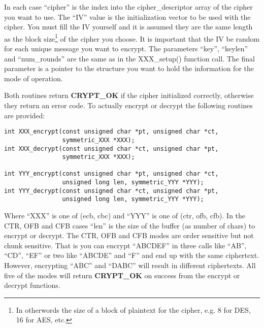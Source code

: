 \documentclass[b5paper]{book}
\begin{document}
In each case ``cipher'' is the index into the cipher\_descriptor array of the cipher you want to use.  The ``IV'' value is 
the initialization vector to be used with the cipher.  You must fill the IV yourself and it is assumed they are the same 
length as the block size\footnote{In otherwords the size of a block of plaintext for the cipher, e.g. 8 for DES, 16 for AES, etc.} 
of the cipher you choose.  It is important that the IV  be random for each unique message you want to encrypt.  The 
parameters ``key'', ``keylen'' and ``num\_rounds'' are the same as in the XXX\_setup() function call.  The final parameter 
is a pointer to the structure you want to hold the information for the mode of operation.

Both routines return {\bf CRYPT\_OK} if the cipher initialized correctly, otherwise they return an error code.  To 
actually encrypt or decrypt the following routines are provided:
\begin{verbatim}
int XXX_encrypt(const unsigned char *pt, unsigned char *ct, 
                symmetric_XXX *XXX);
int XXX_decrypt(const unsigned char *ct, unsigned char *pt,
                symmetric_XXX *XXX);

int YYY_encrypt(const unsigned char *pt, unsigned char *ct, 
                unsigned long len, symmetric_YYY *YYY);
int YYY_decrypt(const unsigned char *ct, unsigned char *pt, 
                unsigned long len, symmetric_YYY *YYY);
\end{verbatim}
Where ``XXX'' is one of (ecb, cbc) and ``YYY'' is one of (ctr, ofb, cfb).  In the CTR, OFB and CFB cases ``len'' is the
size of the buffer (as number of chars) to encrypt or decrypt.  The CTR, OFB and CFB modes are order sensitive but not
chunk sensitive.  That is you can encrypt ``ABCDEF'' in three calls like ``AB'', ``CD'', ``EF'' or two like ``ABCDE'' and ``F''
and end up with the same ciphertext.  However, encrypting ``ABC'' and ``DABC'' will result in different ciphertexts.  All
five of the modes will return {\bf CRYPT\_OK} on success from the encrypt or decrypt functions.
\end{document}
